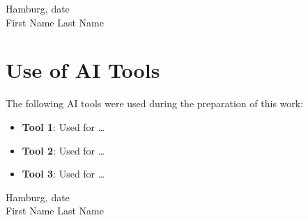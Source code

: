 \documentclass[11pt,a4paper]{article}
\begin{document}
\vspace{2cm}
\begin{flushleft}
Hamburg, date \\
\vspace{0.5cm}
First Name Last Name \end{flushleft}

\newpage
\section*{Use of AI Tools}


The following AI tools were used during the preparation of this work:

\begin{itemize}
	\item \textbf{Tool 1}: Used for \ldots
	\item \textbf{Tool 2}: Used for \ldots
	\item \textbf{Tool 3}: Used for \ldots
\end{itemize}

\vspace{2cm}
\begin{flushleft}
Hamburg, date \\
\vspace{0.5cm}
First Name Last Name \end{flushleft}
\end{document}
